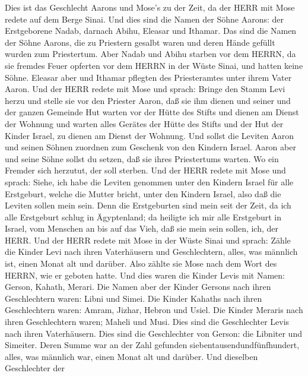  Dies ist das Geschlecht Aarons und Mose's zu der Zeit, da
der HERR mit Mose redete auf dem Berge Sinai.  Und dies sind
die Namen der Söhne Aarons: der Erstgeborene Nadab, darnach Abihu,
Eleasar und Ithamar.  Das sind die Namen der Söhne Aarons,
die zu Priestern gesalbt waren und deren Hände gefüllt wurden zum
Priestertum.  Aber Nadab und Abihu starben vor dem HERRN, da
sie fremdes Feuer opferten vor dem HERRN in der Wüste Sinai, und hatten
keine Söhne. Eleasar aber und Ithamar pflegten des Priesteramtes unter
ihrem Vater Aaron.  Und der HERR redete mit Mose und sprach:
 Bringe den Stamm Levi herzu und stelle sie vor den Priester
Aaron, daß sie ihm dienen  und seiner und der ganzen
Gemeinde Hut warten vor der Hütte des Stifts und dienen am Dienst der
Wohnung  und warten alles Gerätes der Hütte des Stifts und
der Hut der Kinder Israel, zu dienen am Dienst der Wohnung. 
Und sollst die Leviten Aaron und seinen Söhnen zuordnen zum Geschenk von
den Kindern Israel.  Aaron aber und seine Söhne sollst du
setzen, daß sie ihres Priestertums warten. Wo ein Fremder sich herzutut,
der soll sterben.  Und der HERR redete mit Mose und sprach:
 Siehe, ich habe die Leviten genommen unter den Kindern
Israel für alle Erstgeburt, welche die Mutter bricht, unter den Kindern
Israel, also daß die Leviten sollen mein sein.  Denn die
Erstgeburten sind mein seit der Zeit, da ich alle Erstgeburt schlug in
Ägyptenland; da heiligte ich mir alle Erstgeburt in Israel, vom Menschen
an bis auf das Vieh, daß sie mein sein sollen, ich, der HERR.
 Und der HERR redete mit Mose in der Wüste Sinai und
sprach:  Zähle die Kinder Levi nach ihren Vaterhäusern und
Geschlechtern, alles, was männlich ist, einen Monat alt und darüber.
 Also zählte sie Mose nach dem Wort des HERRN, wie er
geboten hatte.  Und dies waren die Kinder Levis mit Namen:
Gerson, Kahath, Merari.  Die Namen aber der Kinder Gersons
nach ihren Geschlechtern waren: Libni und Simei.  Die
Kinder Kahaths nach ihren Geschlechtern waren: Amram, Jizhar, Hebron und
Usiel.  Die Kinder Meraris nach ihren Geschlechtern waren;
Maheli und Musi. Dies sind die Geschlechter Levis nach ihren
Vaterhäusern.  Dies sind die Geschlechter von Gerson: die
Libniter und Simeiter.  Deren Summe war an der Zahl
gefunden siebentausendundfünfhundert, alles, was männlich war, einen
Monat alt und darüber.  Und dieselben Geschlechter der

